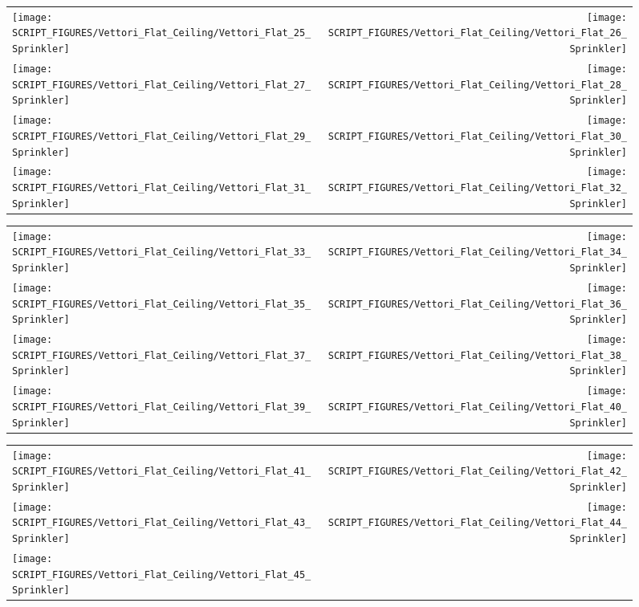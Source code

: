 \begin{figure}[!ht]
\begin{tabular*}{\textwidth}{l@{\extracolsep{\fill}}r}
\texttt{[image: SCRIPT\_FIGURES/Vettori\_Flat\_Ceiling/Vettori\_Flat\_25\_Sprinkler]} &
\texttt{[image: SCRIPT\_FIGURES/Vettori\_Flat\_Ceiling/Vettori\_Flat\_26\_Sprinkler]} \\
\texttt{[image: SCRIPT\_FIGURES/Vettori\_Flat\_Ceiling/Vettori\_Flat\_27\_Sprinkler]} &
\texttt{[image: SCRIPT\_FIGURES/Vettori\_Flat\_Ceiling/Vettori\_Flat\_28\_Sprinkler]} \\
\texttt{[image: SCRIPT\_FIGURES/Vettori\_Flat\_Ceiling/Vettori\_Flat\_29\_Sprinkler]} &
\texttt{[image: SCRIPT\_FIGURES/Vettori\_Flat\_Ceiling/Vettori\_Flat\_30\_Sprinkler]} \\
\texttt{[image: SCRIPT\_FIGURES/Vettori\_Flat\_Ceiling/Vettori\_Flat\_31\_Sprinkler]} &
\texttt{[image: SCRIPT\_FIGURES/Vettori\_Flat\_Ceiling/Vettori\_Flat\_32\_Sprinkler]}
\end{tabular*}
\end{figure}

\begin{figure}[!ht]
\begin{tabular*}{\textwidth}{l@{\extracolsep{\fill}}r}
\texttt{[image: SCRIPT\_FIGURES/Vettori\_Flat\_Ceiling/Vettori\_Flat\_33\_Sprinkler]} &
\texttt{[image: SCRIPT\_FIGURES/Vettori\_Flat\_Ceiling/Vettori\_Flat\_34\_Sprinkler]} \\
\texttt{[image: SCRIPT\_FIGURES/Vettori\_Flat\_Ceiling/Vettori\_Flat\_35\_Sprinkler]} &
\texttt{[image: SCRIPT\_FIGURES/Vettori\_Flat\_Ceiling/Vettori\_Flat\_36\_Sprinkler]} \\
\texttt{[image: SCRIPT\_FIGURES/Vettori\_Flat\_Ceiling/Vettori\_Flat\_37\_Sprinkler]} &
\texttt{[image: SCRIPT\_FIGURES/Vettori\_Flat\_Ceiling/Vettori\_Flat\_38\_Sprinkler]} \\
\texttt{[image: SCRIPT\_FIGURES/Vettori\_Flat\_Ceiling/Vettori\_Flat\_39\_Sprinkler]} &
\texttt{[image: SCRIPT\_FIGURES/Vettori\_Flat\_Ceiling/Vettori\_Flat\_40\_Sprinkler]}
\end{tabular*}
\end{figure}

\begin{figure}[!ht]
\begin{tabular*}{\textwidth}{l@{\extracolsep{\fill}}r}
\texttt{[image: SCRIPT\_FIGURES/Vettori\_Flat\_Ceiling/Vettori\_Flat\_41\_Sprinkler]} &
\texttt{[image: SCRIPT\_FIGURES/Vettori\_Flat\_Ceiling/Vettori\_Flat\_42\_Sprinkler]} \\
\texttt{[image: SCRIPT\_FIGURES/Vettori\_Flat\_Ceiling/Vettori\_Flat\_43\_Sprinkler]} &
\texttt{[image: SCRIPT\_FIGURES/Vettori\_Flat\_Ceiling/Vettori\_Flat\_44\_Sprinkler]} \\
\texttt{[image: SCRIPT\_FIGURES/Vettori\_Flat\_Ceiling/Vettori\_Flat\_45\_Sprinkler]}
\end{tabular*}
\end{figure}

